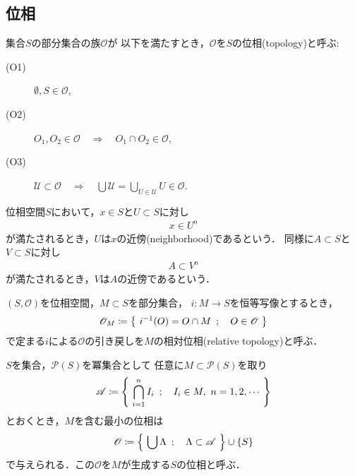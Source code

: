 \subsection{位相}
	\begin{screen}
		\begin{dfn}[位相]
			集合$S$の部分集合の族$\mathscr{O}$が
			以下を満たすとき，$\mathscr{O}$を$S$の位相(topology)と呼ぶ:
			\begin{description}
				\item[(O1)] $\emptyset, S \in \mathscr{O}$,
				\item[(O2)] $O_1,O_2 \in \mathscr{O} 
					\quad \Longrightarrow \quad O_1 \cap O_2 \in \mathscr{O}$,
				\item[(O3)] $\displaystyle\mathscr{U} \subset \mathscr{O}
					\quad \Longrightarrow \quad \bigcup \mathscr{U} = 
					\bigcup_{U \in \mathscr{U}} U \in \mathscr{O}$.
			\end{description}
		\end{dfn}
	\end{screen}
	\begin{screen}
		\begin{dfn}[近傍]
			位相空間$S$において，$x \in S$と$U \subset S$に対し
			\begin{align}
				x \in U^{\mathrm{o}}
			\end{align}
			が満たされるとき，$U$は$x$の近傍(neighborhood)であるという．
			同様に$A \subset S$と$V \subset S$に対し
			\begin{align}
				A \subset V^{\mathrm{o}}
			\end{align}
			が満たされるとき，$V$は$A$の近傍であるという．
		\end{dfn}
	\end{screen}
	
	\begin{screen}
		\begin{dfn}[相対位相]
			$(S,\mathscr{O})$を位相空間，$M \subset S$を部分集合，
			$i:M \longrightarrow S$を恒等写像とするとき，
			\begin{align}
				\mathscr{O}_M \coloneqq 
				\left\{\ i^{-1}(O) = O \cap M\ \, ; \quad O \in \mathscr{O}\ \right\}
			\end{align}
			で定まる$i$による$\mathscr{O}$の引き戻しを$M$の相対位相(relative topology)と呼ぶ．
		\end{dfn}
	\end{screen}
	
	\begin{screen}
		\begin{thm}[位相の生成]
			$S$を集合，$\mathcal{P}(S)$を冪集合として
			任意に$M \subset \mathcal{P}(S)$を取り
			\begin{align}
				\mathscr{A} \coloneqq
				\left\{\ \bigcap_{i=1}^n I_i\ \, ; \quad I_i \in M,\ n = 1,2,\cdots\ \right\}
			\end{align}
			とおくとき，$M$を含む最小の位相は
			\begin{align}
				\mathscr{O} \coloneqq
				\left\{\ \bigcup \Lambda\ \, ; \quad \Lambda \subset \mathscr{A}\ \right\}
				\cup \{S\}
			\end{align}
			で与えられる．この$\mathscr{O}$を$M$が生成する$S$の位相と呼ぶ．
		\end{thm}
	\end{screen}
	
